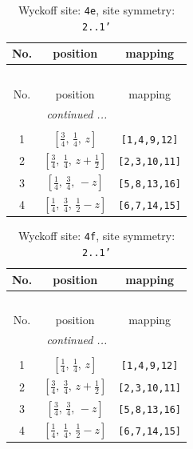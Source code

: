 \documentclass[fleqn,8pt]{jsarticle}
\begin{document}
\renewcommand{\arraystretch}{1.2}
\begin{longtable}{ccc}
\caption{Wyckoff site: {\tt 4e}, site symmetry: {\tt 2..1'}}
 \\
 \hline \hline
No. & position & mapping \\ \hline \endfirsthead

\multicolumn{2}{l}{\tablename\ \thetable{}} \\
 \hline \hline
No. & position & mapping \\ \hline \endhead

 \hline \hline
\multicolumn{2}{r}{\footnotesize\it continued ...} \\ \endfoot

 \hline \hline
\multicolumn{2}{r}{} \\ \endlastfoot

1 & $\left[ \frac{3}{4},\, \frac{1}{4},\, z \right]$ & {\tt [1,4,9,12]} \\ \hline
2 & $\left[ \frac{3}{4},\, \frac{1}{4},\, z + \frac{1}{2} \right]$ & {\tt [2,3,10,11]} \\ \hline
3 & $\left[ \frac{1}{4},\, \frac{3}{4},\, - z \right]$ & {\tt [5,8,13,16]} \\ \hline
4 & $\left[ \frac{1}{4},\, \frac{3}{4},\, \frac{1}{2} - z \right]$ & {\tt [6,7,14,15]} \\
\end{longtable}
\renewcommand{\arraystretch}{1.2}
\begin{longtable}{ccc}
\caption{Wyckoff site: {\tt 4f}, site symmetry: {\tt 2..1'}}
 \\
 \hline \hline
No. & position & mapping \\ \hline \endfirsthead

\multicolumn{2}{l}{\tablename\ \thetable{}} \\
 \hline \hline
No. & position & mapping \\ \hline \endhead

 \hline \hline
\multicolumn{2}{r}{\footnotesize\it continued ...} \\ \endfoot

 \hline \hline
\multicolumn{2}{r}{} \\ \endlastfoot

1 & $\left[ \frac{1}{4},\, \frac{1}{4},\, z \right]$ & {\tt [1,4,9,12]} \\ \hline
2 & $\left[ \frac{3}{4},\, \frac{3}{4},\, z + \frac{1}{2} \right]$ & {\tt [2,3,10,11]} \\ \hline
3 & $\left[ \frac{3}{4},\, \frac{3}{4},\, - z \right]$ & {\tt [5,8,13,16]} \\ \hline
4 & $\left[ \frac{1}{4},\, \frac{1}{4},\, \frac{1}{2} - z \right]$ & {\tt [6,7,14,15]} \\
\end{longtable}
\end{document}
